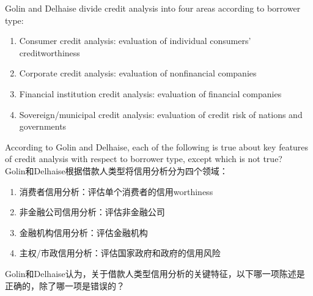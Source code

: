 \documentclass{article}
\newcounter{question} %
\begin{document}
\begin{question}
    Golin and Delhaise divide credit analysis into four areas according to borrower type:
    \begin{enumerate}
        \item Consumer credit analysis: evaluation of individual consumers' creditworthiness
        \item Corporate credit analysis: evaluation of nonfinancial companies
        \item Financial institution credit analysis: evaluation of financial companies
        \item Sovereign/municipal credit analysis: evaluation of credit risk of nations and governments
    \end{enumerate}
    According to Golin and Delhaise, each of the following is true about key features of credit analysis with respect to borrower type, except which is not true?
    \\ Golin和Delhaise根据借款人类型将信用分析分为四个领域：
    \begin{enumerate}
        \item 消费者信用分析：评估单个消费者的信用worthiness
        \item 非金融公司信用分析：评估非金融公司
        \item 金融机构信用分析：评估金融机构
        \item 主权/市政信用分析：评估国家政府和政府的信用风险
    \end{enumerate}
    Golin和Delhaise认为，关于借款人类型信用分析的关键特征，以下哪一项陈述是正确的，除了哪一项是错误的？
\end{question}
\end{document}
